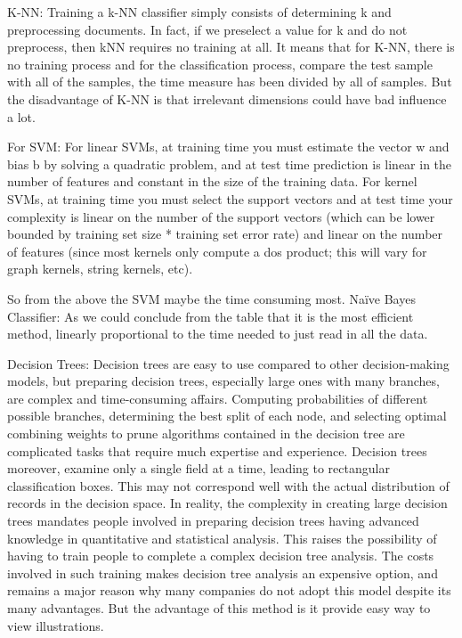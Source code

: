 \documentclass[]{article}
\begin{document}
K-NN: Training a k-NN classifier simply consists of determining k and preprocessing documents. In fact, if we preselect a value for k and do not preprocess, then kNN requires no training at all. It means that for K-NN, there is no training process and for the classification process, compare the test sample with all of the samples, the time measure has been divided by all of samples.
But the disadvantage of K-NN is that irrelevant dimensions could have bad influence a lot.

For SVM: For linear SVMs, at training time you must estimate the vector w and bias b by solving a quadratic problem, and at test time prediction is linear in the number of features and constant in the size of the training data. For kernel SVMs, at training time you must select the support vectors and at test time your complexity is linear on the number of the support vectors (which can be lower bounded by training set size * training set error rate) and linear on the number of features (since most kernels only compute a dos product; this will vary for graph kernels, string kernels, etc).

So from the above the SVM maybe the time consuming most.
Naïve Bayes Classifier: As we could conclude from the table that it is the most efficient method, linearly proportional to the time needed to just read in all the data.

Decision Trees: Decision trees are easy to use compared to other decision-making models, but preparing decision trees, especially large ones with many branches, are complex and time-consuming affairs.
Computing probabilities of different possible branches, determining the best split of each node, and selecting optimal combining weights to prune algorithms contained in the decision tree are complicated tasks that require much expertise and experience.
Decision trees moreover, examine only a single field at a time, leading to rectangular classification boxes. This may not correspond well with the actual distribution of records in the decision space.
In reality, the complexity in creating large decision trees mandates people involved in preparing decision trees having advanced knowledge in quantitative and statistical analysis. This raises the possibility of having to train people to complete a complex decision tree analysis. The costs involved in such training makes decision tree analysis an expensive option, and remains a major reason why many companies do not adopt this model despite its many advantages. But the advantage of this method is it provide easy way to view illustrations.
\end{document}
